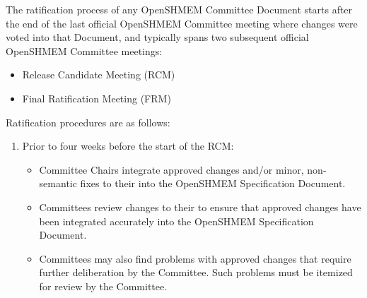 The ratification process of any OpenSHMEM Committee Document starts after the
end of the last official OpenSHMEM Committee meeting where changes were voted
into that Document, and typically spans two subsequent official OpenSHMEM
Committee meetings:

\begin{itemize}
\item Release Candidate Meeting (RCM)
\item Final Ratification Meeting (FRM)
\end{itemize}

Ratification procedures are as follows:

\begin{enumerate}
\item Prior to four weeks before the start of the RCM:
  \begin{itemize}
  \item {} Committee Chairs integrate approved changes and/or
    minor, non-semantic fixes to their  into the OpenSHMEM Specification
    Document.
  \item {} Committees review changes to their  to ensure
    that approved changes have been integrated accurately into the OpenSHMEM
    Specification Document.
  \item {} Committees may also find problems with approved
    changes that require further deliberation by the Committee.  Such
    problems must be itemized for review by the Committee.
  \end{itemize}


\end{enumerate}
